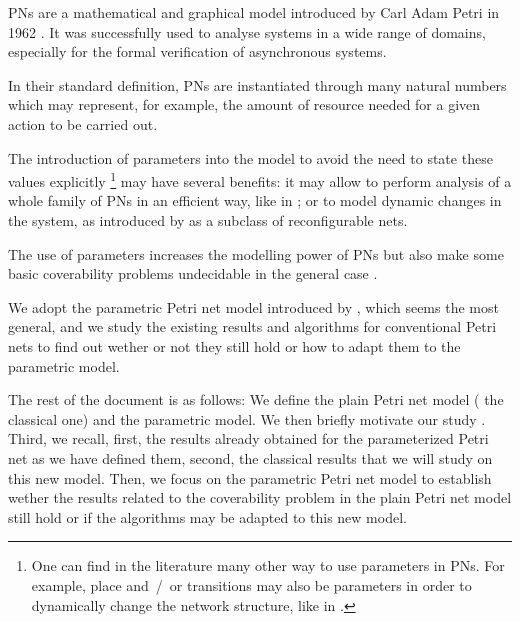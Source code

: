 \acp{PN} are a mathematical and graphical model introduced by Carl Adam Petri in 1962 \cite{Petri62}. It was successfully used to analyse systems in a wide range of domains, especially for the formal verification of asynchronous systems.

In their standard definition, \acp{PN} are instantiated through many natural numbers which may represent, for example, the amount of resource needed for a given action to be carried out.

The introduction of parameters into the model to avoid the need to state these values explicitly%
\footnote{One can find in the literature many other way to use parameters in \acp{PN}. For example, place and~/~or transitions may also be parameters in order to dynamically change the network structure, like in \cite{Christensen97}.}
may have several benefits:
it may allow to perform analysis of a whole family of \acp{PN} in an efficient way, like in \cite{Abdulla13}; or to model dynamic changes in the system, as introduced by \cite{Badouel99} as a subclass of reconfigurable nets.

The use of parameters increases the modelling power of \acp{PN} but also make some basic coverability problems undecidable in the general case \cite{David17}.

We adopt the parametric Petri net model introduced by \cite{David17}, which seems the most general, and we study the existing results and algorithms for conventional Petri nets to find out wether or not they still hold or how to adapt them to the parametric model.

The rest of the document is as follows:
We define the plain Petri net model ( the classical one) and the parametric model.
We then briefly motivate our study .
Third, we recall, first, the results already obtained for the parameterized Petri net as we have defined them, second, the classical results that we will study on this new model.
Then, we focus on the parametric Petri net model to establish wether the results related to the coverability problem in the plain Petri net model still hold or if the algorithms may be adapted to this new model.

